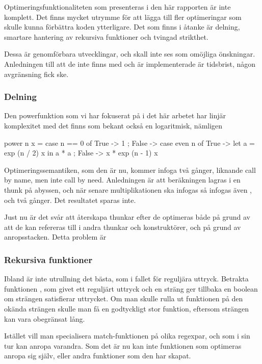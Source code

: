 \documentclass[Rapport]{subfiles}
\begin{document}
Optimeringsfunktionaliteten som presenteras i den här rapporten är inte
komplett. Det finns mycket utrymme för att lägga till fler optimeringar
som skulle kunna förbättra koden ytterligare. Det som finns i åtanke är
delning, smartare hantering av rekursiva funktioner och tvingad strikthet.

Dessa är genomförbara utvecklingar, och skall inte ses som omöjliga önskningar.
Anledningen till att de inte finns med och är implementerade är tidsbrist,
någon avgränsning fick ske.

\subsubsection{Delning}
Den powerfunktion som vi har fokuserat på i det här arbetet har linjär
komplexitet med det finns som bekant också en logaritmisk, nämligen

\begin{codeEx}
power n x = case n == 0 of
    { True  -> 1
    ; False -> case even n of
        { True  -> let a = exp (n / 2) x 
                   in  a * a
        ; False -> x * exp (n - 1) x
        }
    }
\end{codeEx}

Optimeringssemantiken, som den är nu, kommer infoga  två gånger,
liknande call by name, men inte call by need. Anledningen är att beräkningen
 lagras i en thunk på abyssen, och när senare multiplikationen ska
infogas så infogas även , och två gånger. Det resultatet sparas
inte.

    Just nu är det svår att återskapa thunkar efter de optimeras både på grund
av att de kan refereras till i andra thunkar och konstruktörer, och på grund
av anropsstacken. Detta problem är 

\subsubsection{Rekursiva funktioner}

Ibland är inte utrullning det bästa, som i fallet för reguljära uttryck.
Betrakta funktionen , som givet
ett reguljärt uttryck och en sträng ger tillbaka en boolean om strängen
satisfierar uttrycket. Om man skulle rulla ut funktionen på den okända strängen
skulle man få en godtyckligt stor funktion, eftersom strängen kan vara 
obegränsat lång.

    Istället vill man specialisera match-funktionen på olika regexpar, och
som i sin tur kan anropa varandra. Som det är nu kan inte funktionen som
optimeras anropa sig själv, eller andra funktioner som den har skapat.
\end{document}
